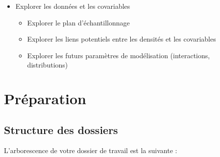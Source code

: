 \documentclass[french,a4paper]{article}
\providecommand{\tightlist}{%
  \setlength{\itemsep}{0pt}\setlength{\parskip}{0pt}}
\begin{document}
\begin{itemize}
\tightlist
\item
  Explorer les données et les covariables

  \begin{itemize}
  \tightlist
  \item
    Explorer le plan d'échantillonnage
  \item
    Explorer les liens potentiels entre les densités et les covariables
  \item
    Explorer les futurs paramètres de modélisation (interactions,
    distributions)
  \end{itemize}
\end{itemize}



\section{Préparation}\label{preparation}

\subsection{Structure des dossiers}\label{structure-des-dossiers}


L'arborescence de votre dossier de travail est la suivante :
\end{document}
